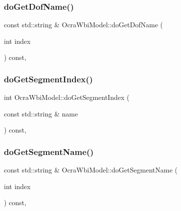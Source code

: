 \hypertarget{classocra__icub_1_1OcraWbiModel_a63909e361f9361a6b20be8c0121b6d3c}{}\label{classocra__icub_1_1OcraWbiModel_a63909e361f9361a6b20be8c0121b6d3c} 
\subsubsection{\texorpdfstring{do\+Get\+Dof\+Name()}{doGetDofName()}}
{\footnotesize\ttfamily const std\+::string \& Ocra\+Wbi\+Model\+::do\+Get\+Dof\+Name (\begin{DoxyParamCaption}\item[{int}]{index }\end{DoxyParamCaption}) const\hspace{0.3cm}{\ttfamily [protected]}, {\ttfamily [virtual]}}

\hypertarget{classocra__icub_1_1OcraWbiModel_a2587c2c67336e33077d50dd0f5a9e36a}{}\label{classocra__icub_1_1OcraWbiModel_a2587c2c67336e33077d50dd0f5a9e36a} 
\subsubsection{\texorpdfstring{do\+Get\+Segment\+Index()}{doGetSegmentIndex()}}
{\footnotesize\ttfamily int Ocra\+Wbi\+Model\+::do\+Get\+Segment\+Index (\begin{DoxyParamCaption}\item[{const std\+::string \&}]{name }\end{DoxyParamCaption}) const\hspace{0.3cm}{\ttfamily [protected]}, {\ttfamily [virtual]}}

\hypertarget{classocra__icub_1_1OcraWbiModel_adaa942dfad4d88adec255f3eac59e443}{}\label{classocra__icub_1_1OcraWbiModel_adaa942dfad4d88adec255f3eac59e443} 
\subsubsection{\texorpdfstring{do\+Get\+Segment\+Name()}{doGetSegmentName()}}
{\footnotesize\ttfamily const std\+::string \& Ocra\+Wbi\+Model\+::do\+Get\+Segment\+Name (\begin{DoxyParamCaption}\item[{int}]{index }\end{DoxyParamCaption}) const\hspace{0.3cm}{\ttfamily [protected]}, {\ttfamily [virtual]}}

